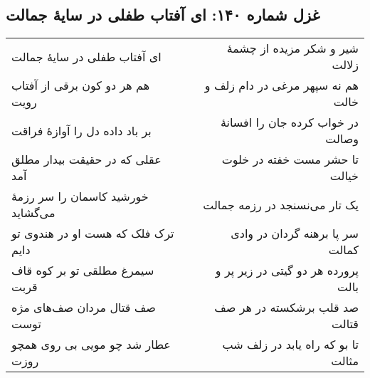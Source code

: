 \begin{center}
\section*{غزل شماره ۱۴۰: ای آفتاب طفلی در سایهٔ جمالت}
\label{sec:140}
\begin{longtable}{l p{0.5cm} r}
ای آفتاب طفلی در سایهٔ جمالت
&&
شیر و شکر مزیده از چشمهٔ زلالت
\\
هم هر دو کون برقی از آفتاب رویت
&&
هم نه سپهر مرغی در دام زلف و خالت
\\
بر باد داده دل را آوازهٔ فراقت
&&
در خواب کرده جان را افسانهٔ وصالت
\\
عقلی که در حقیقت بیدار مطلق آمد
&&
تا حشر مست خفته در خلوت خیالت
\\
خورشید کاسمان را سر رزمهٔ می‌گشاید
&&
یک تار می‌نسنجد در رزمه جمالت
\\
ترک فلک که هست او در هندوی تو دایم
&&
سر پا برهنه گردان در وادی کمالت
\\
سیمرغ مطلقی تو بر کوه قاف قربت
&&
پرورده هر دو گیتی در زیر پر و بالت
\\
صف قتال مردان صف‌های مژه توست
&&
صد قلب برشکسته در هر صف قتالت
\\
عطار شد چو مویی بی روی همچو روزت
&&
تا بو که راه یابد در زلف شب مثالت
\\
\end{longtable}
\end{center}
